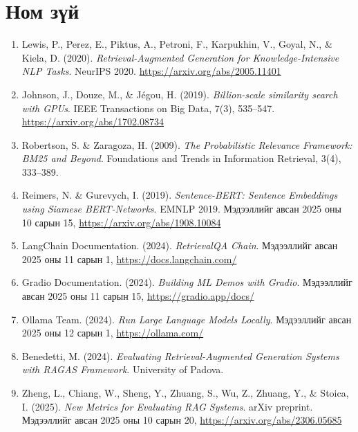 \documentclass[11pt,a4paper]{article}
\begin{document}
\section*{Ном зүй}

\begin{enumerate}
    \item Lewis, P., Perez, E., Piktus, A., Petroni, F., Karpukhin, V., Goyal, N., \& Kiela, D.
          (2020). \textit{Retrieval-Augmented Generation for Knowledge-Intensive NLP Tasks}.
          NeurIPS 2020. \url{https://arxiv.org/abs/2005.11401}

    \item Johnson, J., Douze, M., \& Jégou, H. (2019). \textit{Billion-scale similarity search
          with GPUs}. IEEE Transactions on Big Data, 7(3), 535--547.
          \url{https://arxiv.org/abs/1702.08734}

    \item Robertson, S. \& Zaragoza, H. (2009). \textit{The Probabilistic Relevance Framework:
          BM25 and Beyond}. Foundations and Trends in Information Retrieval, 3(4), 333--389.

    \item Reimers, N. \& Gurevych, I. (2019). \textit{Sentence-BERT: Sentence Embeddings using
          Siamese BERT-Networks}. EMNLP 2019. Мэдээллийг авсан 2025 оны 10 сарын 15,
          \url{https://arxiv.org/abs/1908.10084}

    \item LangChain Documentation. (2024). \textit{RetrievalQA Chain}. Мэдээллийг авсан
          2025 оны 11 сарын 1, \url{https://docs.langchain.com/}

    \item Gradio Documentation. (2024). \textit{Building ML Demos with Gradio}. Мэдээллийг
          авсан 2025 оны 11 сарын 15, \url{https://gradio.app/docs/}

    \item Ollama Team. (2024). \textit{Run Large Language Models Locally}. Мэдээллийг авсан
          2025 оны 12 сарын 1, \url{https://ollama.com/}

    \item Benedetti, M. (2024). \textit{Evaluating Retrieval-Augmented Generation Systems with
          RAGAS Framework}. University of Padova.

    \item Zheng, L., Chiang, W., Sheng, Y., Zhuang, S., Wu, Z., Zhuang, Y., \& Stoica, I.
          (2025). \textit{New Metrics for Evaluating RAG Systems}. arXiv preprint.
          Мэдээллийг авсан 2025 оны 10 сарын 20,
          \url{https://arxiv.org/abs/2306.05685}


\end{enumerate}
\end{document}
